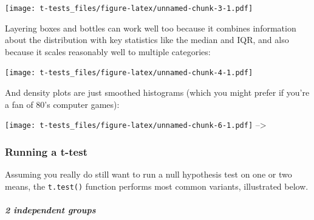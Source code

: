 \documentclass[]{article}
\newenvironment{Shaded}{\begin{snugshade}}{\end{snugshade}}
\newcommand{\DataTypeTok}[1]{\textcolor[rgb]{0.13,0.29,0.53}{#1}}
\newcommand{\DecValTok}[1]{\textcolor[rgb]{0.00,0.00,0.81}{#1}}
\newcommand{\KeywordTok}[1]{\textcolor[rgb]{0.13,0.29,0.53}{\textbf{#1}}}
\newcommand{\NormalTok}[1]{#1}
\newcommand{\OperatorTok}[1]{\textcolor[rgb]{0.81,0.36,0.00}{\textbf{#1}}}
\newcommand{\StringTok}[1]{\textcolor[rgb]{0.31,0.60,0.02}{#1}}
\let\oldsubparagraph\subparagraph
\renewcommand{\subparagraph}[1]{\oldsubparagraph{#1}\mbox{}}
\begin{document}
\texttt{[image: t-tests\_files/figure-latex/unnamed-chunk-3-1.pdf]}

Layering boxes and bottles can work well too because it combines information
about the distribution with key statistics like the median and IQR, and also
because it scales reasonably well to multiple categories:

\begin{Shaded}
\end{Shaded}

\texttt{[image: t-tests\_files/figure-latex/unnamed-chunk-4-1.pdf]}

And density plots are just smoothed histograms (which you might prefer if you're a fan of 80's computer games):

\begin{Shaded}
\end{Shaded}

\texttt{[image: t-tests\_files/figure-latex/unnamed-chunk-6-1.pdf]}
--\textgreater{}

\hypertarget{running-a-t-test}{%
\subsubsection*{Running a t-test}\label{running-a-t-test}}

Assuming you really do still want to run a null hypothesis test on one or two
means, the \texttt{t.test()} function performs most common variants, illustrated below.

\hypertarget{independent-groups}{%
\subparagraph{2 independent groups}\label{independent-groups}}
\end{document}
